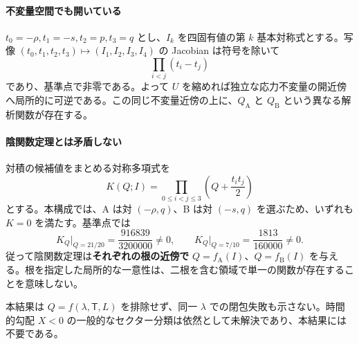 \documentclass[11pt,a4paper]{article}
\newcommand{\Tmix}{\mathsf T}
\begin{document}
\paragraph{不変量空間でも開いている}
$t_0=-\rho,t_1=-s,t_2=p,t_3=q$ とし、$I_k$ を四固有値の第 $k$ 基本対称式とする。写像 $(t_0,t_1,t_2,t_3)\mapsto(I_1,I_2,I_3,I_4)$ の Jacobian は符号を除いて
\begin{equation}\label{eq:vandermonde}
\prod_{i<j}(t_i-t_j)
\end{equation}
であり、基準点で非零である。よって $U$ を縮めれば独立な応力不変量の開近傍へ局所的に可逆である。この同じ不変量近傍の上に、$Q_{\mathrm A}$ と $Q_{\mathrm B}$ という異なる解析関数が存在する。

\paragraph{陰関数定理とは矛盾しない}
対積の候補値をまとめる対称多項式を
\begin{equation}\label{eq:K}
K(Q;I)=\prod_{0\leq i<j\leq3}\left(Q+\frac{t_it_j}{2}\right)
\end{equation}
とする。本構成では、A は対 $(-\rho,q)$、B は対 $(-s,q)$ を選ぶため、いずれも $K=0$ を満たす。基準点では
\begin{equation}\label{eq:Kderivatives}
K_Q\big|_{Q=21/20}=\frac{916839}{3200000}\ne0,\qquad
K_Q\big|_{Q=7/10}=\frac{1813}{160000}\ne0 .
\end{equation}
従って陰関数定理は\textbf{それぞれの根の近傍で} $Q=f_{\mathrm A}(I)$、$Q=f_{\mathrm B}(I)$ を与える。根を指定した局所的な一意性は、二根を含む領域で単一の関数が存在することを意味しない。

本結果は $Q=f(\lambda,\Tmix,L)$ を排除せず、同一 $\lambda$ での閉包失敗も示さない。時間的勾配 $X<0$ の一般的なセクター分類は依然として未解決であり、本結果には不要である。

\newpage
\appendix
\end{document}

